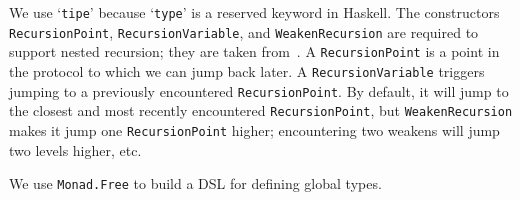 \documentclass[runningheads,plain]{llncs}
\begin{document}

\noindent We use `\texttt{tipe}' because `\texttt{type}' is a reserved keyword in Haskell. 
The constructors \texttt{RecursionPoint}, \texttt{RecursionVariable}, and  \texttt{WeakenRecursion} are required to support nested
recursion; they are taken from~\cite{van2017session}. A
\texttt{RecursionPoint} is a point in the protocol to which we can 
jump back later. A \texttt{RecursionVariable} triggers jumping to a
previously encountered \texttt{RecursionPoint}. By default, it will jump
to the closest and most recently encountered \texttt{RecursionPoint},
but \texttt{WeakenRecursion} makes it jump one \texttt{RecursionPoint}
higher; encountering two weakens will jump two levels higher, etc.

We use \texttt{Monad.Free} to build a DSL for defining global types. 
\end{document}
